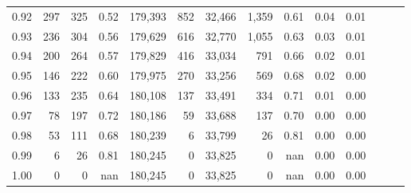 \begin{tabular}{rrrrrrrrrrrrrr}
0.92 &    297 &  325 &  0.52 &  179,393 &      852 &  32,466 &   1,359 &  0.61 &  0.04 &      0.01 \\
0.93 &    236 &  304 &  0.56 &  179,629 &      616 &  32,770 &   1,055 &  0.63 &  0.03 &      0.01 \\
0.94 &    200 &  264 &  0.57 &  179,829 &      416 &  33,034 &     791 &  0.66 &  0.02 &      0.01 \\
0.95 &    146 &  222 &  0.60 &  179,975 &      270 &  33,256 &     569 &  0.68 &  0.02 &      0.00 \\
0.96 &    133 &  235 &  0.64 &  180,108 &      137 &  33,491 &     334 &  0.71 &  0.01 &      0.00 \\
0.97 &     78 &  197 &  0.72 &  180,186 &       59 &  33,688 &     137 &  0.70 &  0.00 &      0.00 \\
0.98 &     53 &  111 &  0.68 &  180,239 &        6 &  33,799 &      26 &  0.81 &  0.00 &      0.00 \\
0.99 &      6 &   26 &  0.81 &  180,245 &        0 &  33,825 &       0 &   nan &  0.00 &      0.00 \\
1.00 &      0 &    0 &   nan &  180,245 &        0 &  33,825 &       0 &   nan &  0.00 &      0.00 \\
\bottomrule
\end{tabular}
